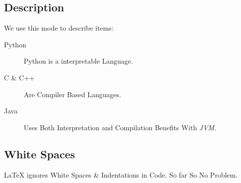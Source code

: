 \documentclass{article}
\begin{document}
		\subsection{Description}
			We use this mode to describe items:
			\begin{description}
				\item[Python] Python is a interpretable Language.
				\item[C \& C++] Are Compiler Based Languages.
				\item[Java] Uses Both Interpretation and Compilation Benefits With \emph{JVM}.
			\end{description}
		\subsection{White Spaces}
			LaTeX ignores White Spaces \& Indentations in Code. So far So No Problem.
\end{document}
